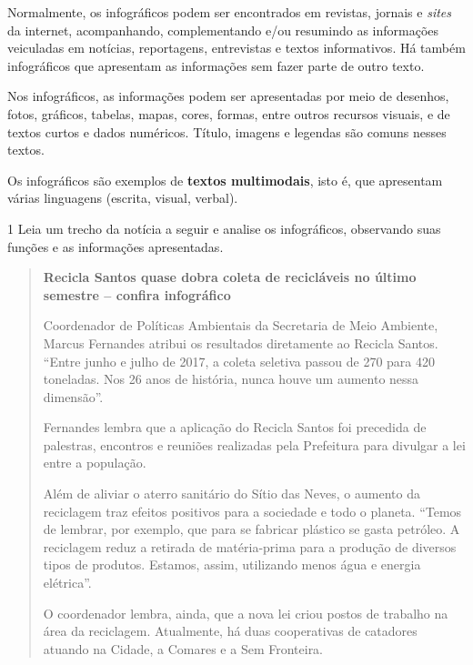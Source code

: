 {Normalmente, os infográficos podem ser encontrados em revistas, jornais
e \emph{sites} da internet, acompanhando, complementando e/ou resumindo
as informações veiculadas em notícias, reportagens, entrevistas e textos
informativos. Há também infográficos que apresentam as informações sem
fazer parte de outro texto.

Nos infográficos, as informações podem ser apresentadas por meio de
desenhos, fotos, gráficos, tabelas, mapas, cores, formas, entre outros
recursos visuais, e de textos curtos e dados numéricos. Título, imagens 
e legendas são comuns nesses textos.

Os infográficos são exemplos de \textbf{textos multimodais}, isto é,
que apresentam várias linguagens (escrita, visual, verbal).
}



\num{1} Leia um trecho da notícia a seguir e analise os infográficos,
observando suas funções e as informações apresentadas.

\begin{quote}
\textbf{Recicla Santos quase dobra coleta de recicláveis no último
semestre -- confira infográfico}


Coordenador de Políticas Ambientais da Secretaria de Meio Ambiente,
Marcus Fernandes atribui os resultados diretamente ao Recicla Santos.
``Entre junho e julho de 2017, a coleta seletiva passou de 270 para 420
toneladas. Nos 26 anos de história, nunca houve um aumento nessa
dimensão''.

Fernandes lembra que a aplicação do Recicla Santos foi precedida de
palestras, encontros e reuniões realizadas pela Prefeitura para divulgar
a lei entre a população.

Além de aliviar o aterro sanitário do Sítio das Neves, o aumento da
reciclagem traz efeitos positivos para a sociedade e todo o planeta.
``Temos de lembrar, por exemplo, que para se fabricar plástico se gasta
petróleo. A reciclagem reduz a retirada de matéria-prima para a produção
de diversos tipos de produtos. Estamos, assim, utilizando menos água e
energia elétrica''.

O coordenador lembra, ainda, que a nova lei criou postos de trabalho na
área da reciclagem. Atualmente, há duas cooperativas de catadores
atuando na Cidade, a Comares e a Sem Fronteira.

\end{quote}

